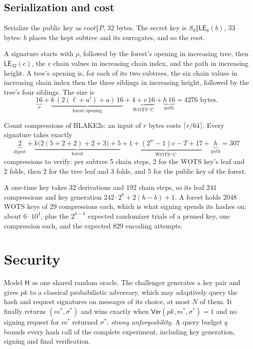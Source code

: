 \documentclass[11pt]{article}
\theoremstyle{plain}
\theoremstyle{definition}
\newcommand{\Ver}{\mathsf{Ver}}
\newcommand{\hash}{\mathsf{H}}
\newcommand{\LE}{\mathsf{LE}}
\newcommand{\concat}{\mathbin\Vert}
\newcommand{\pk}{\mathit{pk}}
\newcommand{\rootnode}{\mathit{root}}
\begin{document}
\subsection{Serialization and cost}
\label{sec:costs}

Serialize the public key as $\rootnode\concat P$, 32 bytes. The secret key is $S_0\concat\LE_8(b)$, 33 bytes: $b$ places the kept subtree and its surrogates, and so the root.

A signature starts with $\rho$, followed by the forest's opening in increasing tree, then $\LE_{32}(c)$, the $v$ chain values in increasing chain index, and the path in increasing height. A tree's opening is, for each of its two subtrees, the six chain values in increasing chain index then the three siblings in increasing height, followed by the tree's four siblings. The size is
\[
  \underbrace{16}_{\rho}
  +\underbrace{k\,(2(\ell+a')+a)\,16}_{\text{forest opening}}
  +\underbrace{4+v\,16}_{\text{WOTS$^+$C}}
  +\underbrace{h\,16}_{\text{path}}
  =4276\text{ bytes}.
\]

Count compressions of BLAKE2s: an input of $r$ bytes costs $\lceil r/64\rceil$. Every signature takes exactly
\[
  \underbrace{2}_{\text{digest}}
  +\underbrace{k\bigl(2(5+2+2)+2+3\bigr)+5}_{\text{forest}}
  +\underbrace{1+(2^w-1)v-T+17}_{\text{WOTS$^+$C}}
  +\underbrace{h}_{\text{path}}
  =307
\]
compressions to verify: per subtree 5 chain steps, 2 for the WOTS key's leaf and 2 folds, then 2 for the tree leaf and 3 folds, and 5 for the public key of the forest.

A one-time key takes $32$ derivations and $192$ chain steps, so its leaf $241$ compressions and key generation $242\cdot2^b+2(h-b)+1$. A forest holds $2048$ WOTS keys of $29$ compressions each, which is what signing spends its hashes on: about $6\cdot10^4$, plus the $2^{h-b}$ expected randomizer trials of a pruned key, one compression each, and the expected $829$ encoding attempts.

\section{Security}
\label{sec:security}

Model $\hash$ as one shared random oracle. The challenger generates a key pair and gives $\pk$ to a classical probabilistic adversary, which may adaptively query the hash and request signatures on messages of its choice, at most $N$ of them. It finally returns $(m^*,\sigma^*)$ and wins exactly when $\Ver(\pk,m^*,\sigma^*)=1$ and no signing request for $m^*$ returned $\sigma^*$: \emph{strong unforgeability}. A query budget $q$ bounds every hash call of the complete experiment, including key generation, signing and final verification.
\end{document}
